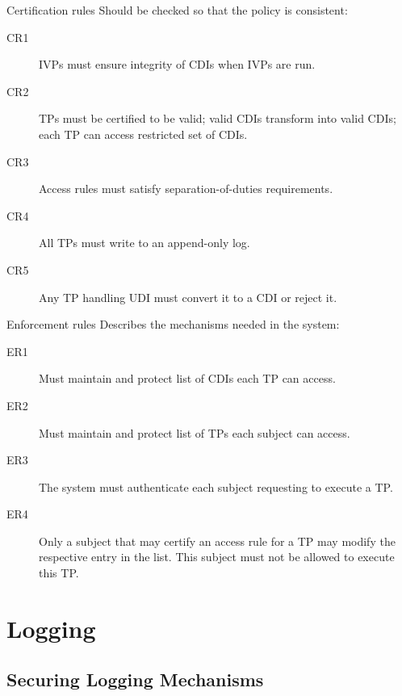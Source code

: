\begin{frame}
  \begin{block}{Certification rules}
    Should be checked so that the policy is consistent:
    \begin{description}
      \item[CR1] IVPs must ensure integrity of CDIs when IVPs are run.
      \item[CR2] TPs must be certified to be valid; valid CDIs transform into 
        valid CDIs; each TP can access restricted set of CDIs.
      \item[CR3] Access rules must satisfy separation-of-duties requirements.
      \item[CR4] All TPs must write to an append-only log.
      \item[CR5] Any TP handling UDI must convert it to a CDI or reject it.
    \end{description}
  \end{block}
\end{frame}

\begin{frame}
  \begin{block}{Enforcement rules}
    Describes the mechanisms needed in the system:
    \begin{description}
      \item[ER1] Must maintain and protect list of CDIs each TP can access.
      \item[ER2] Must maintain and protect list of TPs each subject can access.
      \item[ER3] The system must authenticate each subject requesting to execute 
        a TP\@.
      \item[ER4] Only a subject that may certify an access rule for a TP may 
        modify the respective entry in the list.
        This subject must not be allowed to execute this TP\@.
    \end{description}
  \end{block}
\end{frame}


\section{Logging}

\subsection{Securing Logging Mechanisms}

